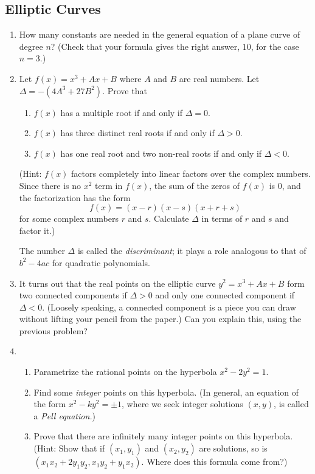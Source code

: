\documentclass{article}
\theoremstyle{plain} %
\theoremstyle{definition}
\theoremstyle{remark}
\numberwithin{equation}{section}
\begin{document}
\subsection{Elliptic Curves}
\begin{enumerate}
\item How many constants are needed in the general equation of a plane curve of degree $n$?
(Check that your formula gives the right answer, $10$, for the case $n = 3$.)
\item Let $f (x) = x^3 + Ax + B$ where $A$ and $B$ are real numbers. Let $\Delta = -(4A^3 + 27B^2)$. Prove
that
\begin{enumerate}
  \item $f (x)$ has a multiple root if and only if $\Delta = 0$.
  \item $f (x)$ has three distinct real roots if and only if $\Delta > 0$.
  \item $f (x)$ has one real root and two non-real roots if and only if $\Delta < 0$.
\end{enumerate}
(Hint: $f (x)$ factors completely into linear factors over the complex numbers. Since
there is no $x^2$ term in $f (x)$, the sum of the zeros of $f (x)$ is 0, and the factorization has
the form
\[
  f (x) = (x - r)(x - s)(x + r + s)
\]
for some complex numbers $r$ and $s$. Calculate $\Delta$ in terms of $r$ and $s$ and factor it.)

The number $\Delta$ is called the \emph{discriminant}; it plays a role analogous to that of $b^2 - 4ac$
for quadratic polynomials.
\item It turns out that the real points on the elliptic curve $y^2 = x^3 + Ax + B$ form two
connected components if $\Delta > 0$ and only one connected component if $\Delta < 0$. (Loosely
speaking, a connected component is a piece you can draw without lifting your pencil
from the paper.) Can you explain this, using the previous
problem?
\item \begin{enumerate}
  \item Parametrize the rational points on the hyperbola $x^2 - 2y^2 = 1$.
  \item Find some \emph{integer} points on this hyperbola. (In general, an equation of the form $x^2 - ky^2 = \pm 1$, where we seek integer solutions $(x,y)$, is called a \emph{Pell equation.})
  \item Prove that there are infinitely many integer points on this hyperbola. (Hint: Show that if $(x_1, y_1)$ and $(x_2, y_2)$ are solutions, so is $(x_1 x_2 + 2 y_1 y_2, x_1 y_2 + y_1 x_2)$. Where does this formula come from?)
\end{enumerate}

\end{enumerate}
\end{document}

